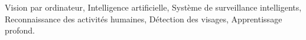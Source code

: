 Vision par ordinateur, Intelligence artificielle, Système de surveillance intelligents, Reconnaissance des activités humaines, Détection des visages, Apprentissage profond.


